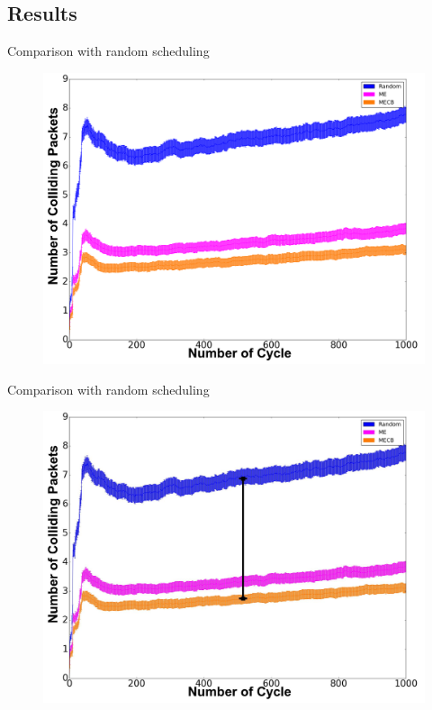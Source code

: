 \subsection{ Results}
\addtocounter{framenumber}{-1}
\begin{withoutheadline}
\begin{frame}{Comparison with random scheduling}

\begin{figure}[p]

\includegraphics[width=.9\linewidth]{figures/graph1.png}

\end{figure}



\end{frame}
\end{withoutheadline}

\begin{withoutheadline}
\addtocounter{framenumber}{-1}
\begin{frame}{Comparison with random scheduling}

\begin{figure}[p]


\includegraphics[width=.9\linewidth]{figures/graph1-1.png}
\end{figure}



\end{frame}
\end{withoutheadline}

